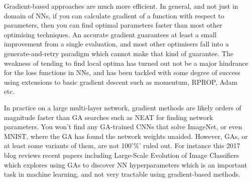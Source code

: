  Gradient-based approaches are much more efficient. In general, and not just in domain of NNs, if you can calculate gradient of a function with respect to parameters, then you can find optimal parameters faster than most other optimising techniques. An accurate gradient guarantees at least a small improvement from a single evaluation, and most other optimisers fall into a generate-and-retry paradigm which cannot make that kind of guarantee. The weakness of tending to find local optima has turned out not be a major hindrance for the loss functions in NNs, and has been tackled with some degree of success using extensions to basic gradient descent such as momentum, RPROP, Adam etc.

 In practice on a large multi-layer network, gradient methods are likely orders of magnitude faster than GA searches such as NEAT for finding network parameters. You won't find any GA-trained CNNs that solve ImageNet, or even MNIST, where the GA has found the network weights unaided. However, GAs, or at least some variants of them, are not 100'\%' ruled out. For instance this 2017 blog reviews recent papers including Large-Scale Evolution of Image Classifiers which explores using GAs to discover NN hyperparameters which is an important task in machine learning, and not very tractable using gradient-based methods.



